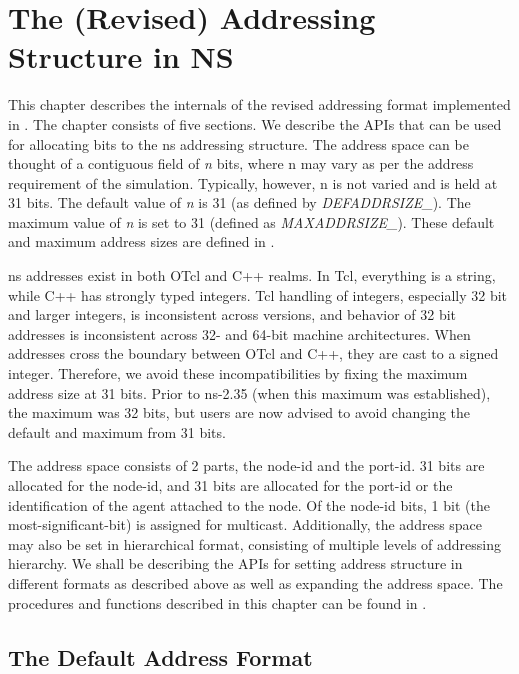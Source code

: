 \chapter{The (Revised) Addressing Structure in NS}
\label{chap:Address}

This chapter describes the internals of the revised addressing format
implemented in \ns. The chapter consists of five sections. We
describe the APIs that can be used for allocating bits to the ns addressing
structure. The address space can be thought
of a contiguous field of {\em n} bits, where n may vary as per the
address requirement of the simulation. Typically, however, n is not varied
and is held at 31 bits.  The default value of {\em n} is
31 (as defined by {\em DEFADDRSIZE\_}). The maximum value of {\em n} is
set to 31 (defined as {\em MAXADDRSIZE\_}). These default and maximum 
address sizes are defined in .

ns addresses exist in both OTcl and C++ realms.  In Tcl, everything is
a string, while C++ has strongly typed integers.  Tcl handling of integers,
especially 32 bit and larger integers, is inconsistent across versions, and
behavior of 32 bit addresses is inconsistent across 32- and 64-bit 
machine architectures.  When addresses cross the boundary between OTcl and
C++, they are cast to a signed integer.  Therefore, we avoid these 
incompatibilities by fixing the maximum address size at 31 bits.  
Prior to ns-2.35 (when
this maximum was established), the maximum was 32 bits, but users are now
advised to avoid changing the default and maximum from 31 bits.

The address space consists of 2 parts, the node-id and the port-id.
31 bits are allocated for the node-id, and 31 bits are allocated for the 
port-id or
the identification of the agent attached to the node. Of the node-id
bits, 1 bit (the most-significant-bit) is assigned for multicast. 
Additionally, the address space may
also be set in hierarchical format, consisting of multiple levels of
addressing hierarchy. 
We shall be describing the APIs for setting address structure in
different formats as described above as well as expanding the address
space. 
The procedures and functions described in this chapter can be found in
.

\section{The Default Address Format}
\label{sec:defaultFormat}

